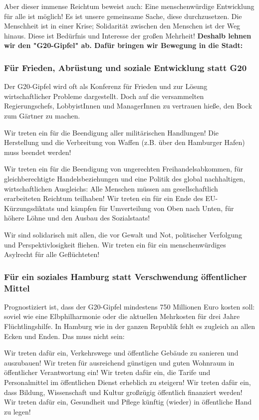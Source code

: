 \documentclass[ngerman,headheight=70pt]{scrartcl}
\begin{document}
    Aber dieser immense Reichtum beweist auch: Eine menschenwürdige Entwicklung
    für alle ist möglich! Es ist unsere gemeinsame Sache, diese durchzusetzen.
    Die Menschheit ist in einer Krise; Solidarität zwischen den Menschen ist der
    Weg hinaus. Diese ist Bedürfnis und Interesse der großen Mehrheit!
    \textbf{Deshalb lehnen wir den "G20-Gipfel" ab. Dafür bringen wir Bewegung
    in die Stadt:}

    \subsubsection*{Für Frieden, Abrüstung und soziale Entwicklung statt G20}

    Der G20-Gipfel wird oft als Konferenz für Frieden und zur Lösung
    wirtschaftlicher Probleme dargestellt. Doch auf die versammelten Regierungschefs,
    LobbyistInnen und ManagerInnen zu vertrauen hieße, den Bock zum Gärtner zu
    machen.

    Wir treten ein für die Beendigung aller militärischen Handlungen! Die
    Herstellung und die Verbreitung von Waffen (z.B. über den Hamburger Hafen)
    muss beendet werden!

    Wir treten ein für die Beendigung von ungerechten Freihandelsabkommen, für
    gleichberechtigte Handelsbeziehungen und eine Politik des global nachhaltigen,
    wirtschaftlichen Ausgleichs: Alle Menschen müssen am gesellschaftlich
    erarbeiteten Reichtum teilhaben! Wir treten ein für ein Ende des
    EU-Kürzungsdiktats und kämpfen für Umverteilung von Oben nach Unten, für
    höhere Löhne und den Ausbau des Sozialstaats!

    Wir sind solidarisch mit allen, die vor Gewalt und Not, politischer Verfolgung
    und Perspektivlosigkeit fliehen. Wir treten ein für ein menschenwürdiges
    Asylrecht für alle Geflüchteten!

    \subsubsection*{Für ein soziales Hamburg statt Verschwendung öffentlicher Mittel}

    Prognostiziert ist, dass der G20-Gipfel mindestens 750 Millionen Euro kosten
    soll: soviel wie eine Elbphilharmonie oder die aktuellen Mehrkosten für drei
    Jahre Flüchtlingshilfe. In Hamburg wie in der ganzen Republik fehlt es
    zugleich an allen Ecken und Enden. Das muss nicht sein:

    Wir treten dafür ein, Verkehrswege und öffentliche Gebäude zu sanieren und
    auszubauen! Wir treten für ausreichend günstigen und guten Wohnraum in
    öffentlicher Verantwortung ein! Wir treten dafür ein, die Tarife und
    Personalmittel im öffentlichen Dienst erheblich zu steigern! Wir treten dafür
    ein, dass Bildung, Wissenschaft und Kultur großzügig öffentlich finanziert
    werden! Wir treten dafür ein, Gesundheit und Pflege künftig (wieder) in
    öffentliche Hand zu legen!
\end{document}
